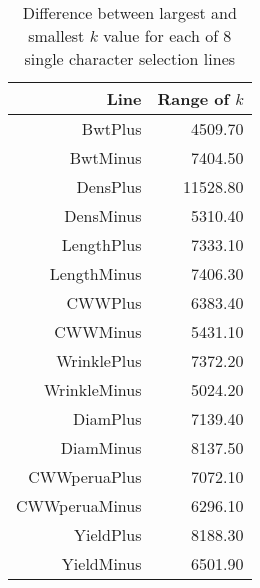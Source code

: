 \begin{table}[ht]
\label{tab:lineranges}
\centering
\caption{Difference between largest and smallest $k$ value for each of 8 single character selection lines}
\vspace{0.1in}
\begin{tabular}{rr}
  \hline
 Line & Range of $k$ \\ 
  \hline
BwtPlus & 4509.70 \\ 
  BwtMinus & 7404.50 \\ 
  DensPlus & 11528.80 \\ 
  DensMinus & 5310.40 \\ 
  LengthPlus & 7333.10 \\ 
  LengthMinus & 7406.30 \\ 
  CWWPlus & 6383.40 \\ 
  CWWMinus & 5431.10 \\ 
  WrinklePlus & 7372.20 \\ 
  WrinkleMinus & 5024.20 \\ 
  DiamPlus & 7139.40 \\ 
  DiamMinus & 8137.50 \\ 
  CWWperuaPlus & 7072.10 \\ 
  CWWperuaMinus & 6296.10 \\ 
  YieldPlus & 8188.30 \\ 
  YieldMinus & 6501.90 \\ 
   \hline
\end{tabular}
\end{table}

